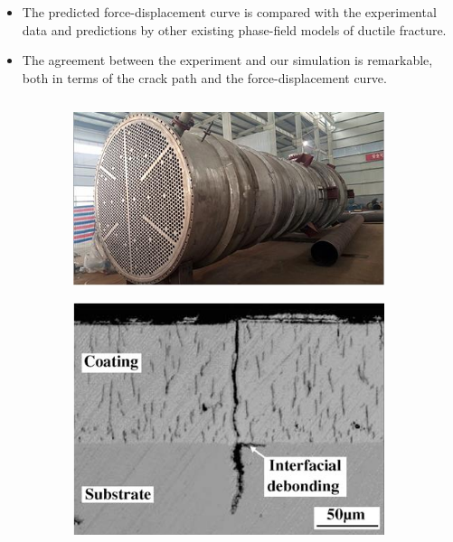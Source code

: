 \begin{frame}
\begin{columns}[T]
\begin{column}{0.4\textwidth}
\begin{itemize}
        \item The predicted \textcolor{peggyblue}{force-displacement curve} is compared with the experimental data and predictions by other existing phase-field models of ductile fracture.
        \item The agreement between the experiment and our simulation is \textcolor{peggyblue}{remarkable}, both in terms of the crack path and the force-displacement curve.
      \end{itemize}
    \end{column}
  \end{columns}
\end{frame}

\begin{frame}
  \begin{columns}[T]
    \begin{column}{0.5\textwidth}
      \begin{figure}
        \centering
        \begin{subfigure}{0.45\textwidth}
          \centering
          \includegraphics[width=\textwidth]{Chapter345/figures/HTHX}
        \end{subfigure}
        \begin{subfigure}{0.45\textwidth}
          \centering
          \includegraphics[width=\textwidth]{Chapter345/figures/debonding}
        \end{subfigure}
      \end{figure}
      

\end{column}
\end{columns}
\end{frame}
